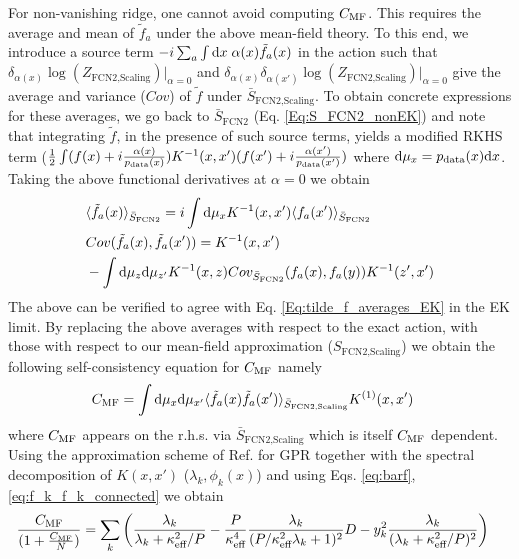 For non-vanishing ridge, one cannot avoid computing $C_{\text{MF}}$. This requires the average and mean of $\tilde{f}_a$ under the above mean-field theory. To this end, we introduce a source term $-i\sum_a \int \text{d} x \; \alpha(x) \tilde{f}_a(x)$ in the action such that $\delta_{\alpha(x)}\log(Z_{\text{FCN2,Scaling}})|_{\alpha=0}$ and $\delta_{\alpha(x)}\delta_{\alpha(x')}\log(Z_{\text{FCN2,Scaling}})|_{\alpha=0}$ give the average and variance ($Cov$) of $\tilde{f}$ under $\bar{S}_{\text{FCN2,Scaling}}$. To obtain concrete expressions for these averages, we go back to $\bar{S}_{\text{FCN2}}$ (Eq. \ref{Eq:S_FCN2_nonEK}) and note that integrating $\tilde{f}$, in the presence of such source terms, yields a modified RKHS term ($\frac{1}{2} \int ({f}(x)+i\frac{\alpha(x)}{p_{\text{data}}(x)}) K^{-1}(x,x') ({f}(x')+i\frac{\alpha(x')}{p_{\text{data}}(x')})$ where $\text{d}\mu_x = p_{\text{data}}(x)\text{d} x$. Taking the above functional derivatives at $\alpha=0$ we obtain 
\begin{align}
&\langle \tilde{f}_a(x) \rangle_{\bar{S}_{\text{FCN2}}} = i \int \text{d}\mu_x K^{-1}(x,x') \langle f_a(x') \rangle_{\bar{S}_{\text{FCN2}}} \\ \nonumber 
&Cov(\tilde{f}_a(x), \tilde{f}_a(x')) = K^{-1}(x,x')\\ \nonumber &-\int \text{d} \mu_z \text{d} \mu_{z'} K^{-1}(x,z) Cov_{\bar{S}_{\text{FCN2}}}(f_a(x),f_a(y)) K^{-1}(z',x') 
\end{align}
The above can be verified to agree with Eq. \ref{Eq:tilde_f_averages_EK} in the EK limit. By replacing the above averages with respect to the exact action, with those with respect to our mean-field approximation ($S_{\text{FCN2,Scaling}}$) we obtain the following self-consistency equation for $C_{\text{MF}}$ namely 
\begin{align}
C_{\text{MF}} &= \int \text{d} \mu_x \text{d}\mu_{x'} \langle \tilde{f}_a(x) \tilde{f}_a(x') \rangle_{\bar{S}_{\text{FCN2,Scaling}}} K^{(1)}(x,x') 
\end{align}
where $C_{\text{MF}}$ appears on the r.h.s. via $\bar{S}_{\text{FCN2,Scaling}}$ which is itself $C_{\text{MF}}$ dependent. Using the approximation scheme of Ref. \cite{Canatar2021} for GPR together with the spectral decomposition of $K(x,x')$ ($\lambda_k,\phi_k(x)$) and using Eqs. \ref{eq:barf},\ref{eq:f_k_f_k_connected} we obtain 
\begin{align}
\label{Eq:CMF_Consistency}
\frac{C_{\text{MF}}}{(1+\frac{C_{\text{MF}}}{N})} &= \sum_k \left( \frac{\lambda_k}{\lambda_k + \kappa^2_{\text{eff}}/P} - \frac{P}{\kappa^4_{\text{eff}}} \frac{\lambda_k}{(P/\kappa_{\text{eff}}^2 \lambda_k+1)^2}D - y_k^2 \frac{\lambda_k}{(\lambda_k+\kappa_{\text{eff}}^2/P)^2} \right)
\end{align}
